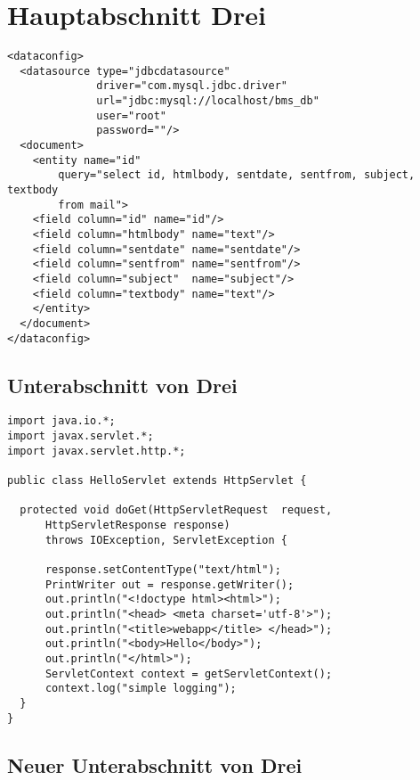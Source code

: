 \section{Hauptabschnitt Drei}\label{hauptabschnitt3}
\Blindtext

\lstset{language=xml}
\begin{lstlisting}[float=ht!, frame=htrbl, caption={die datei {\normalfont \ttfamily  data-config.xml} dient als beispiel für xml quellcode}, label={lst:dataconfigxml}]
<dataconfig>
  <datasource type="jdbcdatasource" 
              driver="com.mysql.jdbc.driver"
              url="jdbc:mysql://localhost/bms_db"
              user="root" 
              password=""/>
  <document>
    <entity name="id"
        query="select id, htmlbody, sentdate, sentfrom, subject, textbody
        from mail">
    <field column="id" name="id"/>
    <field column="htmlbody" name="text"/>
    <field column="sentdate" name="sentdate"/>
    <field column="sentfrom" name="sentfrom"/>
    <field column="subject"  name="subject"/>
    <field column="textbody" name="text"/>
    </entity>
  </document>
</dataconfig>
\end{lstlisting}
\Blindtext

\subsection{Unterabschnitt von Drei}\label{hauptabschnitt3.1}

\Blindtext

\lstset{language=java}
\begin{lstlisting}[float=ht!, frame=htrbl, caption={das listing zeigt java quellcode}, label={lst:result2}]
import java.io.*;
import javax.servlet.*;
import javax.servlet.http.*;

public class HelloServlet extends HttpServlet {

  protected void doGet(HttpServletRequest  request, 
      HttpServletResponse response)
      throws IOException, ServletException {

      response.setContentType("text/html");
      PrintWriter out = response.getWriter();
      out.println("<!doctype html><html>");
      out.println("<head> <meta charset='utf-8'>");
      out.println("<title>webapp</title> </head>");
      out.println("<body>Hello</body>");
      out.println("</html>");
      ServletContext context = getServletContext();
      context.log("simple logging");
  }
}
\end{lstlisting}
\Blindtext

\subsection{Neuer Unterabschnitt von Drei}\label{hauptabschnitt3.2}

\Blindtext
